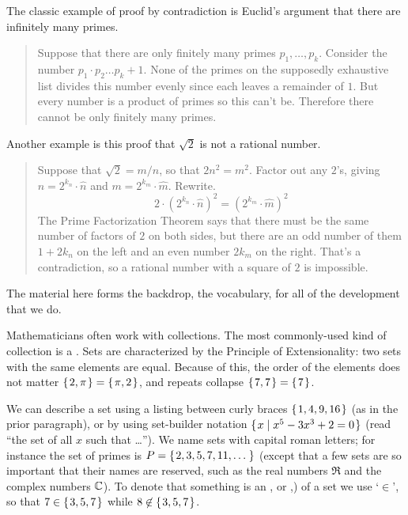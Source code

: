 The classic example of proof by contradiction is Euclid's
argument that there are infinitely many primes.
\begin{quote}\small
Suppose that there are only finitely many primes \( p_1,\dots,p_k \).
Consider the number \( p_1\cdot p_2\dots p_k +1 \).
None of the primes on the supposedly exhaustive list divides this number
evenly since each leaves a remainder of \( 1 \).
But every number is a product of primes so this can't be.
Therefore there cannot be only finitely many primes.
\end{quote}

Another example is this proof that
\( \sqrt{2} \) is not a rational number.
\begin{quote}\small
Suppose that  \( \sqrt{2}=m/n \), so that $2n^2=m^2$.
Factor out any \( 2 \)'s, giving
\( n=2^{k_n}\cdot \hat{n} \)
and
\( m=2^{k_m}\cdot \hat{m} \).
Rewrite.
\begin{equation*}
  2\cdot (2^{k_n}\cdot \hat{n})^2
  =
  (2^{k_m}\cdot \hat{m})^2
\end{equation*}
The Prime Factorization Theorem says that there must be the same number of
factors of \( 2 \) on both sides, but there are an odd number of them
\( 1+2k_n \) on the left and an even number \( 2k_m \) on the right.
That's a contradiction, so a rational number with a square of
\( 2 \) is impossible.
\end{quote}














The material here forms the backdrop, the vocabulary,
for all of the development that we do.

Mathematicians often work with collections. 
The most commonly-used kind of collection is a . 
Sets are characterized by the Principle of Extensionality: 
two sets with the same elements are equal. 
Because of this, the order of the elements does not matter 
\( \mbox{$\{\hspace{0.1em}2,\pi\hspace{0.1em}\}$}=\mbox{$\{\hspace{0.1em}\pi,2\hspace{0.1em}\}$} \), 
and
repeats collapse \( \mbox{$\{\hspace{0.1em}7,7\hspace{0.1em}\}$}=\mbox{$\{\hspace{0.1em}7\hspace{0.1em}\}$} \).

We can describe a set using a listing between curly braces
\( \mbox{$\{\hspace{0.1em} 1,4,9,16 \hspace{0.1em}\}$} \) (as in the prior paragraph), 
or by using set-builder notation
\( \mbox{$\{\hspace{0.1em}x\mid x^5-3x^3+2=0 \hspace{0.1em}\}$} \) (read ``the set of all \( x \)
such that \ldots'').
We name sets with capital roman letters; for instance the set of primes is
\( P=\mbox{$\{\hspace{0.1em}2,3,5,7,11,\ldots\,\hspace{0.1em}\}$} \) (except that a few sets 
are so important that their names are reserved, such as the
real numbers \( \Re \)
and the complex numbers \( \mathbb{C} \)).
To denote that something is an 
, 
or ,) of a set we
use `\(\in \)',
so that \( 7\in\mbox{$\{\hspace{0.1em}3,5,7\hspace{0.1em}\}$} \) while \( 8\not\in\mbox{$\{\hspace{0.1em}3,5,7\hspace{0.1em}\}$} \).

